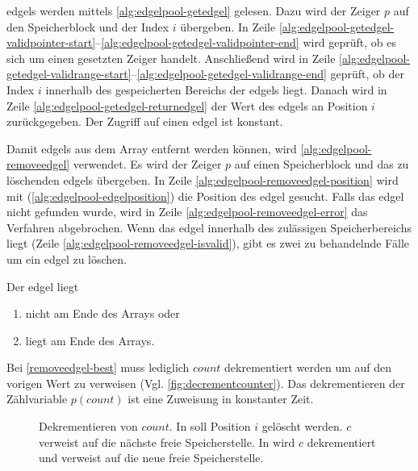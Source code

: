 

\glspl{edgel} werden mittels \autoref{alg:edgelpool-getedgel} gelesen. Dazu wird der Zeiger $p$ auf den Speicherblock
 und der Index $i$ übergeben. In Zeile
 \ref{alg:edgelpool-getedgel-validpointer-start}--\ref{alg:edgelpool-getedgel-validpointer-end} wird geprüft, ob es
 sich um einen gesetzten Zeiger handelt. Anschließend wird in Zeile
 \ref{alg:edgelpool-getedgel-validrange-start}--\ref{alg:edgelpool-getedgel-validrange-end} geprüft, ob der Index $i$
 innerhalb des gespeicherten Bereichs der \glspl{edgel} liegt. Danach wird in Zeile
 \ref{alg:edgelpool-getedgel-returnedgel} der Wert des \glspl{edgel} an Position $i$ zurückgegeben. Der Zugriff auf
 einen \gls{edgel} ist konstant.



Damit \glspl{edgel} aus dem Array entfernt werden können, wird \autoref{alg:edgelpool-removeedgel} verwendet. Es wird
 der Zeiger $p$ auf einen Speicherblock und das zu löschenden \glspl{edgel} übergeben. In Zeile
 \ref{alg:edgelpool-removeedgel-position} wird mit  (\autoref{alg:edgelpool-edgelposition}) die
 Position des \gls{edgel} gesucht. Falls das \gls{edgel} nicht gefunden wurde, wird in Zeile
 \ref{alg:edgelpool-removeedgel-error} das Verfahren abgebrochen. Wenn das \gls{edgel} innerhalb des zulässigen
 Speicherbereichs liegt (Zeile \ref{alg:edgelpool-removeedgel-isvalid}), gibt es zwei zu behandelnde Fälle um ein
 \gls{edgel} zu löschen.



Der \gls{edgel} liegt
\begin{enumerate}
	\item nicht am Ende des Arrays oder \label{removeedgel-worst}
	\item liegt am Ende des Arrays. \label{removeedgel-best}
\end{enumerate}

Bei \autoref{removeedgel-best} muss lediglich $\mathit{count}$ dekrementiert werden um auf den vorigen Wert zu verweisen
 (Vgl. \autoref{fig:decrementcounter}). Das dekrementieren der Zählvariable $p(\mathit{count})$ ist eine Zuweisung in
 konstanter Zeit.

\begin{figure}[!ht]
	\centering
	\subfigure[]{
		
		\label{fig:decrementcounter-before}
	}
	\subfigure[]{
		
		\label{fig:decrementcounter-after}
	}
	\caption{Dekrementieren von $\mathit{count}$. In  soll Position $i$ gelöscht
	 werden. $c$ verweist auf die nächste freie Speicherstelle. In  wird $c$
	 dekrementiert und verweist auf die neue freie Speicherstelle.}
	\label{fig:decrementcounter}
\end{figure}


